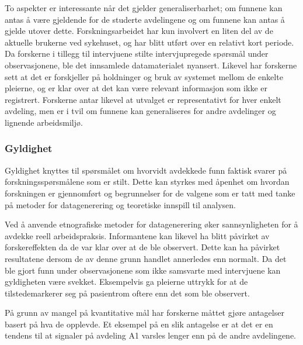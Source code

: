 \noindent
To aspekter er interessante når det gjelder generaliserbarhet; om funnene kan antas å være gjeldende for de studerte avdelingene og om funnene kan antas å gjelde utover dette.  Forskningsarbeidet har kun involvert en liten del av de aktuelle brukerne ved sykehuset, og har blitt utført over en relativt kort periode. Da forskerne i tillegg til intervjuene stilte intervjupregede spørsmål under observasjonene, ble det innsamlede datamaterialet nyansert. Likevel har forskerne sett at det er forskjeller på holdninger og bruk av systemet mellom de enkelte pleierne, og er klar over at det kan være relevant informasjon som ikke er registrert. Forskerne antar likevel at utvalget er representativt for hver enkelt avdeling, men er i tvil om funnene kan generaliseres for andre avdelinger og lignende arbeidsmiljø. 

\subsubsection{Gyldighet}
Gyldighet knyttes til spørsmålet om hvorvidt avdekkede funn faktisk svarer på forskningsspørsmålene som er stilt. Dette kan styrkes med åpenhet om hvordan forskningen er gjennomført og begrunnelser for de valgene som er tatt med tanke på metoder for datagenerering og teoretiske innspill til analysen. 

\noindent
Ved å anvende etnografiske metoder for datagenerering øker sannsynligheten for å avdekke reell arbeidspraksis. Informantene kan likevel ha blitt påvirket av forskereffekten da de var klar over at de ble observert. Dette kan ha påvirket resultatene dersom de av denne grunn handlet annerledes enn normalt. Da det ble gjort funn under observasjonene som ikke samsvarte med intervjuene kan gyldigheten være svekket. Eksempelvis ga pleierne uttrykk for at de tilstedemarkerer seg på pasientrom oftere enn det som ble observert.

\noindent
På grunn av mangel på kvantitative mål har forskerne måttet gjøre antagelser basert på hva de opplevde. Et eksempel på en slik antagelse er at det er en tendens til at signaler på avdeling A1 varsles lenger enn på de andre avdelingene.
